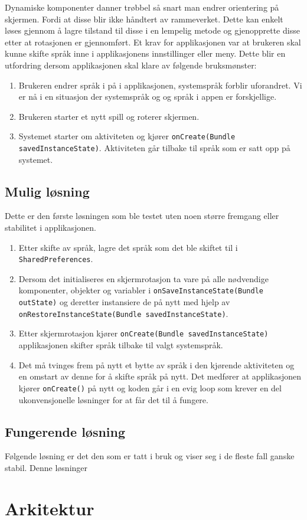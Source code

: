 Dynamiske komponenter danner trøbbel så snart man endrer orientering på skjermen. Fordi at disse blir ikke håndtert av rammeverket. Dette kan enkelt løses gjennom å lagre tilstand til disse i en lempelig metode og gjenopprette disse etter at rotasjonen er gjennomført. Et krav for applikasjonen var at brukeren skal kunne skifte språk inne i applikasjonens innstillinger eller meny. Dette blir en utfordring dersom applikasjonen skal klare av følgende bruksmønster:
\begin{enumerate}
\item Brukeren endrer språk i på i applikasjonen, systemspråk forblir uforandret. Vi er nå i en situasjon der systemspråk og og språk i appen er forskjellige. 
\item Brukeren starter et nytt spill og roterer skjermen. 
\item Systemet starter om aktiviteten og kjører \texttt{onCreate(Bundle savedInstanceState)}. Aktiviteten går tilbake til språk som er satt opp på systemet. 
\end{enumerate}

\subsection{Mulig løsning}
Dette er den første løsningen som ble testet uten noen større fremgang eller stabilitet i applikasjonen. 
\begin{enumerate}
\item Etter skifte av språk, lagre det språk som det ble skiftet til i \texttt{SharedPreferences}.
\item Dersom det initialiseres en skjermrotasjon ta vare på alle nødvendige komponenter, objekter og variabler i \texttt{onSaveInstanceState(Bundle outState)} og deretter instansiere de på nytt med hjelp av \texttt{onRestoreInstanceState(Bundle savedInstanceState)}.
\item Etter skjermrotasjon kjører \texttt{onCreate(Bundle savedInstanceState)} applikasjonen skifter språk tilbake til valgt systemspråk. 
\item Det må tvinges frem på nytt et bytte av språk i den kjørende aktiviteten og en omstart av denne for å skifte språk på nytt. Det medfører at applikasjonen kjører \texttt{onCreate()} på nytt og koden går i en evig loop som krever en del ukonvensjonelle løsninger for at får det til å fungere. 
\end{enumerate}

\subsection{Fungerende løsning}
Følgende løsning er det den som er tatt i bruk og viser seg i de fleste fall ganske stabil. Denne løsninger 

\section{Arkitektur}


